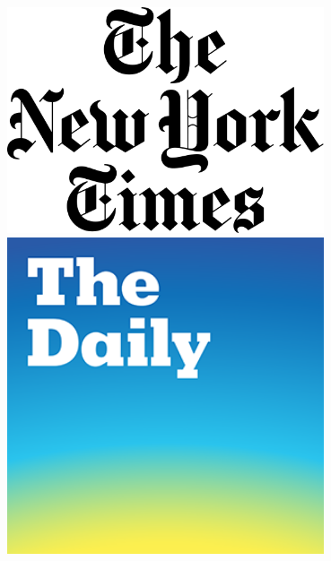 \documentclass[10pt]{beamer}
\begin{document}
\begin{frame}[t]
\begin{columns}[t]
		\begin{column}{0.33\textwidth}
			\begin{center}
				\includegraphics[width=0.7\textwidth]{figures/nyt.png}\\
				\vspace{3.5cm}
				\includegraphics[width=0.7\textwidth]{figures/daily.png}
			\end{center}
		\end{column}
	\end{columns}
\end{frame}
\end{document}
